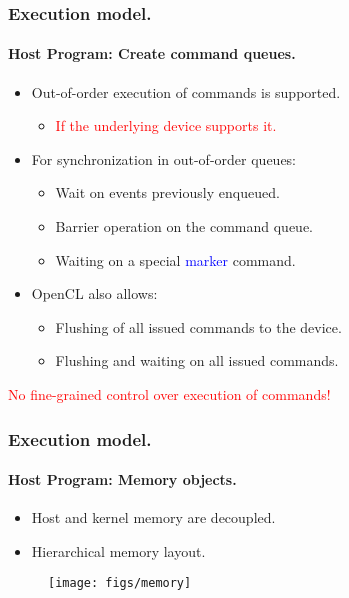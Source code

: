 \documentclass{beamer}
\begin{document}
\begin{frame}[fragile]
\frametitle{Execution model.}
\framesubtitle{Host Program: Create command queues.}

  \begin{itemize}
  \item Out-of-order execution of commands is supported.
    \begin{itemize}
    \item \textcolor{red}{If the underlying device supports it.}
    \end{itemize}
  \item For synchronization in out-of-order queues:
    \begin{itemize}
    \item Wait on events previously enqueued.
    \item Barrier operation on the command queue.
    \item Waiting on a special \textcolor{blue}{marker} command.
    \end{itemize}
  \item OpenCL also allows:
    \begin{itemize}
    \item Flushing of all issued commands to the device.
    \item Flushing and waiting on all issued commands.
    \end{itemize}
  \end{itemize}

  \begin{center}
  \textcolor{red}{No fine-grained control over execution of commands!}
  \end{center}

\end{frame}


\begin{frame}[fragile]
\frametitle{Execution model.}
\framesubtitle{Host Program: Memory objects.}
  \begin{itemize}
  \item Host and kernel memory are decoupled.
  \item Hierarchical memory layout.
  \end{itemize}

  \begin{center}
  \begin{figure}
  \texttt{[image: figs/memory]}
  \end{figure}
  \end{center}
\end{frame}
\end{document}
